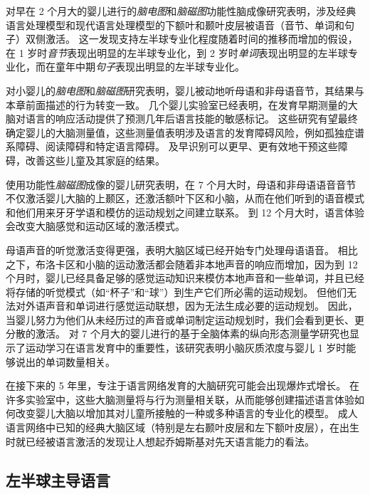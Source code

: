 对早在 2 个月大的婴儿进行的\textit{脑电图}和\textit{脑磁图}功能性脑成像研究表明，涉及经典语言处理模型和现代语言处理模型的下额叶和颞叶皮层被语音（音节、单词和句子）双侧激活。
这一发现支持左半球专业化程度随着时间的推移而增加的假设，在 1 岁时\textit{音节}表现出明显的左半球专业化，到 2 岁时\textit{单词}表现出明显的左半球专业化，而在童年中期\textit{句子}表现出明显的左半球专业化。


对小婴儿的\textit{脑电图}和\textit{脑磁图}研究表明，婴儿被动地听母语和非母语音节，其结果与本章前面描述的行为转变一致。
几个婴儿实验室已经表明，在发育早期测量的大脑对语言的响应活动提供了预测几年后语言技能的敏感标记。
这些研究有望最终确定婴儿的大脑测量值，这些测量值表明涉及语言的发育障碍风险，例如孤独症谱系障碍、阅读障碍和特定语言障碍。
及早识别可以更早、更有效地干预这些障碍，改善这些儿童及其家庭的结果。


使用功能性\textit{脑磁图}成像的婴儿研究表明，在 7 个月大时，母语和非母语语音音节不仅激活婴儿大脑的上颞区，还激活额叶下区和小脑，从而在他们听到的语音模式和他们用来牙牙学语和模仿的运动规划之间建立联系。
到 12 个月大时，语言体验会改变大脑感觉和运动区域的激活模式。


母语声音的听觉激活变得更强，表明大脑区域已经开始专门处理母语语音。
相比之下，布洛卡区和小脑的运动激活都会随着非本地声音的响应而增加，因为到 12 个月时，婴儿已经具备足够的感觉运动知识来模仿本地声音和一些单词，并且已经将存储的听觉模式（如“杯子”和“球”）到生产它们所必需的运动规划。
但他们无法对外语声音和单词进行感觉运动联想，因为无法生成必要的运动规划。
因此，当婴儿努力为他们从未经历过的声音或单词制定运动规划时，我们会看到更长、更分散的激活。
对 7 个月大的婴儿进行的基于全脑体素的纵向形态测量学研究也显示了运动学习在语言发育中的重要性，该研究表明小脑灰质浓度与婴儿 1 岁时能够说出的单词数量相关。


在接下来的 5 年里，专注于语言网络发育的大脑研究可能会出现爆炸式增长。
在许多实验室中，这些大脑测量将与行为测量相关联，从而能够创建描述语言体验如何改变婴儿大脑以增加其对儿童所接触的一种或多种语言的专业化的模型。
成人语言网络中已知的经典大脑区域（特别是左右颞叶皮层和左下额叶皮层），在出生时就已经被语言激活的发现让人想起乔姆斯基对先天语言能力的看法。



\subsection{左半球主导语言}

